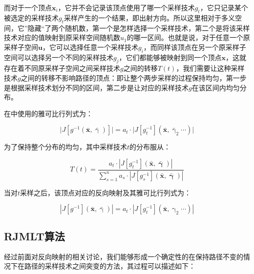 而对于一个顶点$\mathbf{x}_i$，它并不会记录该顶点使用了哪一个采样技术$g_t$，它只记录某个被选定的采样技术$g_t$采样产生的一个结果，即出射方向。所以这里相对于多义空间，它”隐藏“了两个随机数，第一个是怎样选择一个采样技术，第二个是将该采样技术对应的值映射到原采样空间随机数$u_1$的哪一区间。也就是说，对于任意一个原采样子空间$\mathbf{u}$，它可以选择任意一个采样技术$g_i$，而同样该顶点在另一个原采样子空间可以选择另一个不同的采样技术$g_j$，它们都能够被映射到同一个顶点$\mathbf{x}$，这就存在着不同原采样子空间之间采样技术$g$之间的转移$T(t)$，我们需要让这种采样技术$g$之间的转移不影响路径的顶点：即让整个两步采样的过程保持均匀，第一步是根据采样技术划分不同的区间，第二步是让对应的采样技术$g$在该区间内均匀分布。

在\cite{a:ReversibleJumpMetropolisLightTransportusingInverseMappings}中使用的雅可比行列式为：

\begin{equation}
	\big|J[g^{-1}(\bar{\mathbf{x}},\bar{\upgamma})]\big|=a_t\cdot\big|J[g^{-1}_t](\bar{\mathbf{x}},\bar{\upgamma}_2\cdots)\big|
\end{equation}

\noindent 为了保持整个分布的均匀，其中采样技术$t$的分布服从：

\begin{equation}\label{e:mlt-mixtures}
	T(t)=\frac{a_t\cdot|J[g^{-1}_t](\bar{\mathbf{x}},\bar{\mathbf{\upgamma}})|}{\sum^{n}_{s=1}a_s\cdot|J[g^{-1}_s](\bar{\mathbf{x}},\bar{\mathbf{\upgamma}})|}
\end{equation}

\noindent 当对$t$采样之后，该顶点对应的反向映射及其雅可比行列式为：

\begin{equation}
	|J[g^{-1}](\bar{\mathbf{x}},\bar{\upgamma})|=a_t\cdot|J[g^{-1}_t](\bar{\mathbf{x}},\upgamma_2\cdots)|
\end{equation}




\subsection{RJMLT算法}
经过前面对反向映射的相关讨论，我们能够形成一个确定性的在保持路径不变的情况下在路径的采样技术之间突变的方法，其过程可以描述如下：

